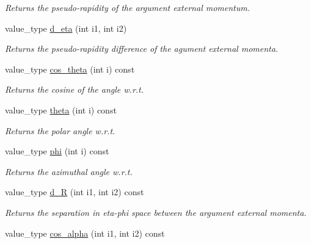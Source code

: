\begin{DoxyCompactItemize}
\begin{DoxyCompactList}\small\item\em Returns the pseudo-\/rapidity of the argument external momentum. \end{DoxyCompactList}\item 
\hypertarget{a00442_ab782f447ae0600fb2734cf4bbbb054ed}{value\-\_\-type \hyperlink{a00442_ab782f447ae0600fb2734cf4bbbb054ed}{d\-\_\-eta} (int i1, int i2)}\label{a00442_ab782f447ae0600fb2734cf4bbbb054ed}

\begin{DoxyCompactList}\small\item\em Returns the pseudo-\/rapidity difference of the agument external momenta. \end{DoxyCompactList}\item 
value\-\_\-type \hyperlink{a00442_a3c250cdd85b2e8c2ccffa1ba428835b8}{cos\-\_\-theta} (int i) const 
\begin{DoxyCompactList}\small\item\em Returns the cosine of the angle w.\-r.\-t. \end{DoxyCompactList}\item 
value\-\_\-type \hyperlink{a00442_a2afb8172a5259681d1ddb6ccbaf7bf83}{theta} (int i) const 
\begin{DoxyCompactList}\small\item\em Returns the polar angle w.\-r.\-t. \end{DoxyCompactList}\item 
value\-\_\-type \hyperlink{a00442_a1cfa4357ba44653535724a0b37e6fb48}{phi} (int i) const 
\begin{DoxyCompactList}\small\item\em Returns the azimuthal angle w.\-r.\-t. \end{DoxyCompactList}\item 
\hypertarget{a00442_a9b4ba5347ce7d475525c1a217cafcf19}{value\-\_\-type \hyperlink{a00442_a9b4ba5347ce7d475525c1a217cafcf19}{d\-\_\-\-R} (int i1, int i2) const }\label{a00442_a9b4ba5347ce7d475525c1a217cafcf19}

\begin{DoxyCompactList}\small\item\em Returns the separation in eta-\/phi space between the argument external momenta. \end{DoxyCompactList}\item 
\hypertarget{a00442_a4dfb607cc3cb4c1844c5b4563d12eed1}{value\-\_\-type \hyperlink{a00442_a4dfb607cc3cb4c1844c5b4563d12eed1}{cos\-\_\-alpha} (int i1, int i2) const }\label{a00442_a4dfb607cc3cb4c1844c5b4563d12eed1}


\end{DoxyCompactItemize}
